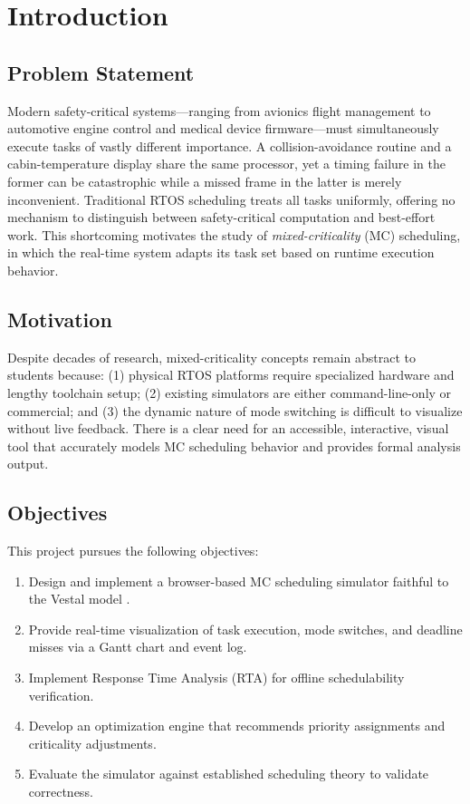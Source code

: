\documentclass[conference]{IEEEtran}
\begin{document}
\section{Introduction}

\subsection{Problem Statement}
Modern safety-critical systems---ranging from avionics flight management to automotive engine control and medical device firmware---must simultaneously execute tasks of vastly different importance. A collision-avoidance routine and a cabin-temperature display share the same processor, yet a timing failure in the former can be catastrophic while a missed frame in the latter is merely inconvenient. Traditional RTOS scheduling treats all tasks uniformly, offering no mechanism to distinguish between safety-critical computation and best-effort work. This shortcoming motivates the study of \textit{mixed-criticality} (MC) scheduling, in which the real-time system adapts its task set based on runtime execution behavior.

\subsection{Motivation}
Despite decades of research, mixed-criticality concepts remain abstract to students because: (1) physical RTOS platforms require specialized hardware and lengthy toolchain setup; (2) existing simulators are either command-line-only or commercial; and (3) the dynamic nature of mode switching is difficult to visualize without live feedback. There is a clear need for an accessible, interactive, visual tool that accurately models MC scheduling behavior and provides formal analysis output.

\subsection{Objectives}
This project pursues the following objectives:
\begin{enumerate}
  \item Design and implement a browser-based MC scheduling simulator faithful to the Vestal model \cite{vestal2007preemptive}.
  \item Provide real-time visualization of task execution, mode switches, and deadline misses via a Gantt chart and event log.
  \item Implement Response Time Analysis (RTA) for offline schedulability verification.
  \item Develop an optimization engine that recommends priority assignments and criticality adjustments.
  \item Evaluate the simulator against established scheduling theory to validate correctness.
\end{enumerate}
\end{document}
